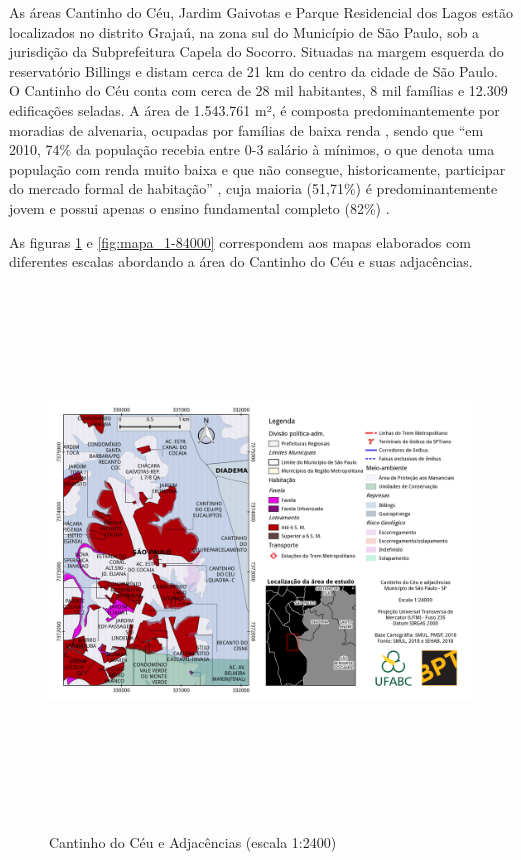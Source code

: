 	As áreas Cantinho do Céu, Jardim Gaivotas e Parque Residencial dos Lagos estão localizados no distrito Grajaú, na zona sul do Município de São Paulo, sob a jurisdição da Subprefeitura Capela do Socorro. Situadas na margem esquerda do reservatório Billings e distam cerca de 21 km do centro da cidade de São Paulo. O Cantinho do Céu conta com cerca de 28 mil habitantes, 8 mil famílias e 12.309 edificações seladas. A área de 1.543.761 m², é composta predominantemente por moradias de alvenaria, ocupadas por famílias de baixa renda \cite{Barda2012}, sendo que ``em 2010, 74\% da população recebia entre 0-3 salário à mínimos, o que denota uma população com renda muito baixa e que não consegue, historicamente, participar do mercado formal de habitação'' \cite[p.116]{Silva2016}, cuja maioria (51,71\%) é predominantemente jovem e possui apenas o ensino fundamental completo (82\%) \cite[p.116]{Silva2016}.
	
	As figuras \ref*{fig:mapa_1-24000} e \ref*{fig:mapa_1-84000} correspondem aos mapas elaborados com diferentes escalas abordando a área do Cantinho do Céu e suas adjacências.
	
	\begin{landscape}
		\begin{figure}
			\centering
			\caption{Cantinho do Céu e Adjacências (escala 1:2400)}
			\includegraphics[height=14cm,keepaspectratio]{img/mapa_1-24000}
			\label{fig:mapa_1-24000}
		\end{figure}
	\end{landscape}


